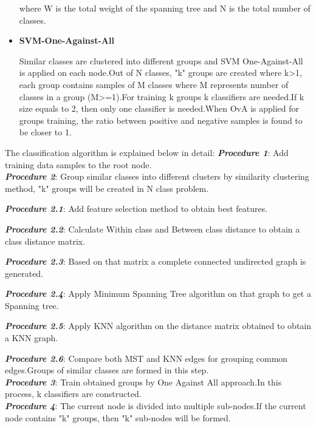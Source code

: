 \documentclass[a4paper, 10pt, conference]{ieeeconf}      %
\begin{document}
\begin{itemize}
\par 
where W is the total weight of the spanning tree and N is the total number of classes.

\item\textbf{SVM-One-Against-All}
\par
Similar classes are clustered into different groups and SVM One-Against-All is applied on each node.Out of N classes, "k" groups are created where k\textgreater1, each group contains samples of M classes where M represents number of classes in a group (M\textgreater=1).For training k groups k classifiers are needed.If k size equals to 2, then only one classifier is needed.When OvA is applied for groups training, the ratio between positive and negative samples is found to be closer to 1.
\end{itemize}
The classification algorithm is explained below in detail:
\newline
\textit{\textbf{Procedure 1}}: Add training data samples to the root node.
\newline \\
\textit{\textbf{Procedure 2}}: Group similar classes into different clusters by similarity clustering method, "k" groups will be created in N class problem.
\par \textit{\textbf{Procedure 2.1}}: Add feature selection method to obtain best features.
\par \textit{\textbf{Procedure 2.2}}: Calculate Within class and Between class distance to obtain a class distance matrix.
\par \textit{\textbf{Procedure 2.3}}: Based on that matrix a complete connected undirected graph is generated.
\par \textit{\textbf{Procedure 2.4}}: Apply Minimum Spanning Tree algorithm on that graph to get a Spanning tree. 
\par \textit{\textbf{Procedure 2.5}}: Apply KNN algorithm on the distance matrix obtained to obtain a KNN graph.
\par\textit{\textbf{Procedure 2.6}}: Compare both MST and KNN edges for grouping common edges.Groups of similar classes are formed in this step. \\
\newline
\textit{\textbf{Procedure 3}}: Train obtained groups by One Against All approach.In this process, k classifiers are constructed.
\newline \\
\textit{\textbf{Procedure 4}}: The current node is divided into multiple sub-nodes.If the current node contains "k" groups, then "k" sub-nodes will be formed.
\end{document}
